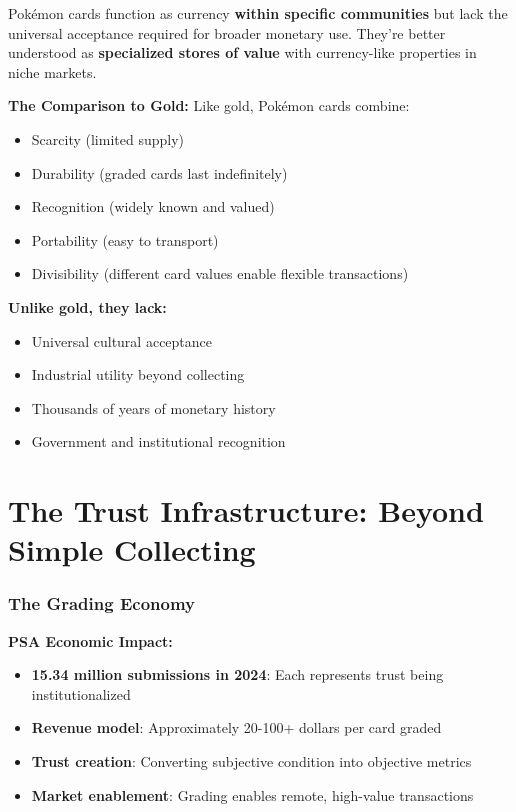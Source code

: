 \documentclass[11pt,oneside]{book}
\begin{document}
Pokémon cards function as currency \textbf{within specific communities} but lack the universal acceptance required for broader monetary use. They're better understood as \textbf{specialized stores of value} with currency-like properties in niche markets.

\textbf{The Comparison to Gold:}
Like gold, Pokémon cards combine:
\begin{itemize}
\item Scarcity (limited supply)
\item Durability (graded cards last indefinitely)
\item Recognition (widely known and valued)
\item Portability (easy to transport)
\item Divisibility (different card values enable flexible transactions)
\end{itemize}

\textbf{Unlike gold, they lack:}
\begin{itemize}
\item Universal cultural acceptance
\item Industrial utility beyond collecting
\item Thousands of years of monetary history
\item Government and institutional recognition
\end{itemize}

\section{The Trust Infrastructure: Beyond Simple Collecting}

\subsubsection{The Grading Economy}

\textbf{PSA Economic Impact:}
\begin{itemize}
\item \textbf{15.34 million submissions in 2024}: Each represents trust being institutionalized
\item \textbf{Revenue model}: Approximately 20-100+ dollars per card graded
\item \textbf{Trust creation}: Converting subjective condition into objective metrics
\item \textbf{Market enablement}: Grading enables remote, high-value transactions
\end{itemize}
\end{document}
